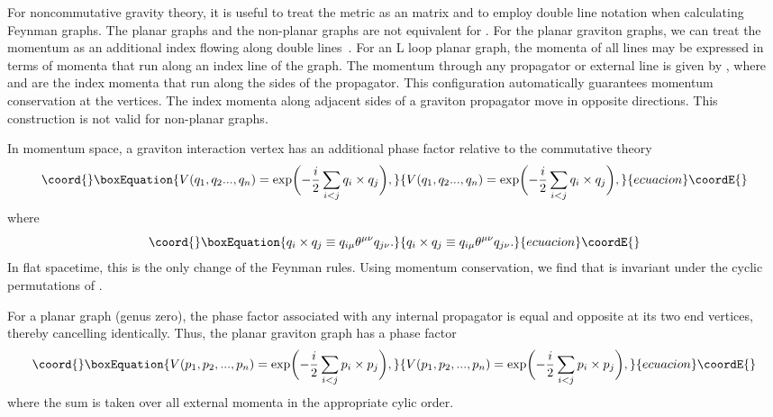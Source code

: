 \documentclass[a4paper,10pt]{article}
\begin{document}
For noncommutative gravity theory, it is useful to treat the
metric \coordHE{} as an \coordHE{} matrix and to employ double line
notation when calculating Feynman graphs. The planar graphs and the
non-planar graphs are not equivalent for \coordHE{}. For the planar
graviton graphs, we can treat the momentum as an additional index flowing
along double lines~\cite{Hooft}. For an L loop planar graph, the momenta of
all lines may be expressed in terms of momenta \coordHE{} that run
along an index line of the graph. The momentum through any propagator or
external line is given by \coordHE{}, where \coordHE{} and \coordHE{} are the index
momenta that run along the sides of the propagator. This configuration
automatically guarantees momentum conservation at the vertices. The index
momenta along adjacent sides of a graviton propagator move in opposite
directions. This construction is not valid for non-planar graphs.

In momentum space, a graviton interaction vertex has an additional phase
factor relative to the commutative
theory~\cite{Filk,Chepelev,Minwalla}
\begin{equation}\coord{}\boxEquation{
V(q_1,q_2...,q_n)=\exp\biggl(-\frac{i}{2}\sum_{i<j}q_i\times q_j\biggr),
}{
V(q_1,q_2...,q_n)=\exp\biggl(-\frac{i}{2}\sum_{i<j}q_i\times q_j\biggr),
}{ecuacion}\coordE{}\end{equation}
where
\begin{equation}\coord{}\boxEquation{
q_i\times q_j\equiv q_{i\mu}\theta^{\mu\nu}q_{j\nu}.
}{
q_i\times q_j\equiv q_{i\mu}\theta^{\mu\nu}q_{j\nu}.
}{ecuacion}\coordE{}\end{equation}
In flat spacetime, this is the only change of the Feynman rules.
Using momentum conservation, we find that \coordHE{} is invariant
under the cyclic permutations of \coordHE{}.

For a planar graph (genus zero), the phase factor associated with any
internal propagator is equal and opposite at its two end vertices, thereby
cancelling identically. Thus, the planar graviton graph has a phase factor
\begin{equation}\coord{}\boxEquation{
V(p_1,p_2,...,p_n)=\exp\biggl(-\frac{i}{2}\sum_{i<j}p_i\times p_j\biggr),
}{
V(p_1,p_2,...,p_n)=\exp\biggl(-\frac{i}{2}\sum_{i<j}p_i\times p_j\biggr),
}{ecuacion}\coordE{}\end{equation}
where the sum is taken over all external momenta in the appropriate cylic
order.
\end{document}
